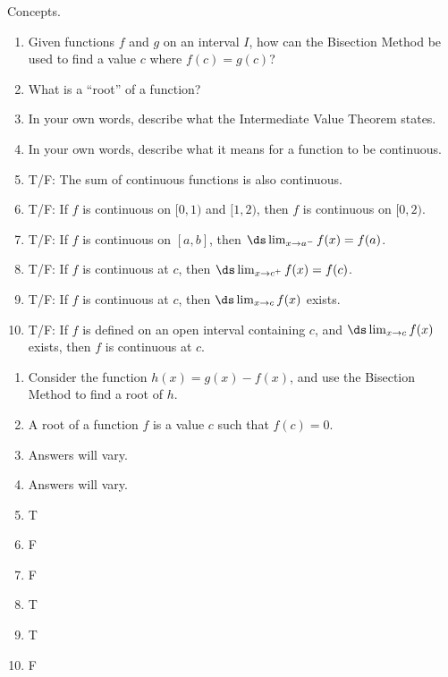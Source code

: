 \begin{enumialphparenastyle}


\begin{ex}
Concepts.
\begin{enumerate}

 
\item {Given functions $f$ and $g$ on an interval $I$, how can the Bisection Method be used to find a value $c$ where $f(c) = g(c)$?}

\item {What is a ``root'' of a function?}

\item {In your own words, describe what the Intermediate Value Theorem states.}


\item {In your own words, describe what it means for a function to be continuous.}
\item {T/F: The sum of continuous functions is also continuous.}
\item {T/F: If $f$ is continuous on $[0,1)$ and $[1,2)$, then $f$ is continuous on $[0,2)$.}

\item {T/F: If $f$ is continuous on $[a,b]$, then $\ds\lim_{x\to a^-}f(x) = f(a)$.}

\item {T/F: If $f$ is continuous at $c$, then $\ds \lim_{x\to c^+}f(x) = f(c)$.}

\item {T/F: If $f$ is continuous at $c$, then $\ds \lim_{x\to c}f(x)$ exists.}

\item {T/F:	If $f$ is defined on an open interval containing $c$, and $\ds \lim_{x\to c}f(x)$ exists, then $f$ is continuous at $c$.
}

\end{enumerate}

\begin{sol}
\begin{enumerate}
\item {Consider the function $h(x) = g(x) - f(x)$, and use the Bisection Method to find a root of $h$.}
\item {A root of a function $f$ is a value $c$ such that $f(c)=0$.}
\item {Answers will vary.}

\item {Answers will vary.}
\item {T}
\item {F}
\item {F}
\item {T}
\item {T}
\item {F}
\end{enumerate}
\end{sol}


\end{ex}
\end{enumialphparenastyle}
